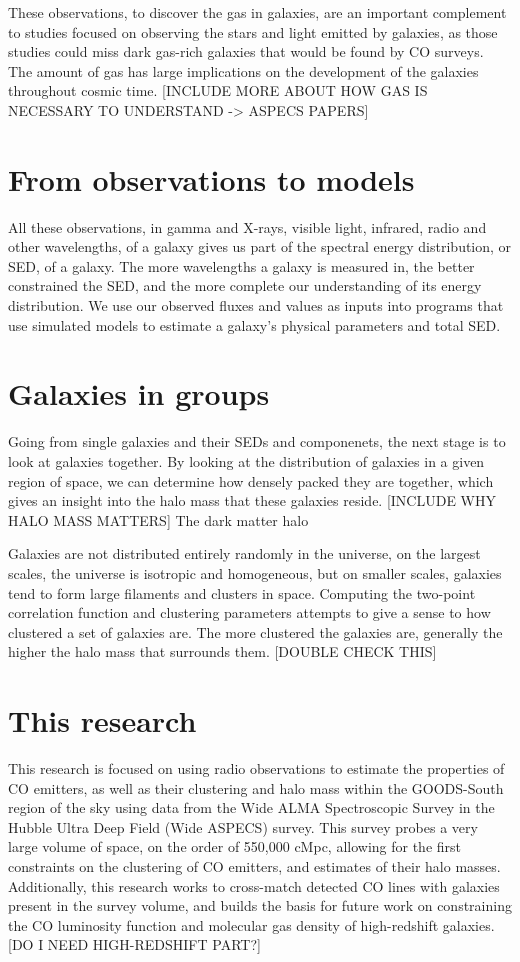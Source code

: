\documentclass[twoside,single]{lion-msc}
\begin{document}
These observations, to discover the gas in galaxies, are an important complement to studies focused on observing the stars and light emitted by galaxies, as those studies could miss dark gas-rich galaxies that would be found by CO surveys. The amount of gas has large implications on the development of the galaxies throughout cosmic time. [INCLUDE MORE ABOUT HOW GAS IS NECESSARY TO UNDERSTAND -> ASPECS PAPERS]


\section{From observations to models}

All these observations, in gamma and X-rays, visible light, infrared, radio and other wavelengths, of a galaxy gives us part of the spectral energy distribution, or SED, of a galaxy. The more wavelengths a galaxy is measured in, the better constrained the SED, and the more complete our understanding of its energy distribution. We use our observed fluxes and values as inputs into programs that use simulated models to estimate a galaxy's physical parameters and total SED.


\section{Galaxies in groups}

Going from single galaxies and their SEDs and componenets, the next stage is to look at galaxies together. By looking at the distribution of galaxies in a given region of space, we can determine how densely packed they are together, which gives an insight into the halo mass that these galaxies reside. [INCLUDE WHY HALO MASS MATTERS] The dark matter halo

Galaxies are not distributed entirely randomly in the universe, on the largest scales, the universe is isotropic and homogeneous, but on smaller scales, galaxies tend to form large filaments and clusters in space. Computing the two-point correlation function and clustering parameters attempts to give a sense to how clustered a set of galaxies are. The more clustered the galaxies are, generally the higher the halo mass that surrounds them. [DOUBLE CHECK THIS]

\section{This research}

This research is focused on using radio observations to estimate the properties of CO emitters, as well as their clustering and halo mass within the GOODS-South region of the sky using data from the Wide ALMA Spectroscopic Survey in the Hubble Ultra Deep Field (Wide ASPECS) survey. This survey probes a very large volume of space, on the order of 550,000 cMpc, allowing for the first constraints on the clustering of CO emitters, and estimates of their halo masses. Additionally, this research works to cross-match detected CO lines with galaxies present in the survey volume, and builds the basis for future work on constraining the CO luminosity function and molecular gas density of high-redshift galaxies. [DO I NEED HIGH-REDSHIFT PART?]
\end{document}
